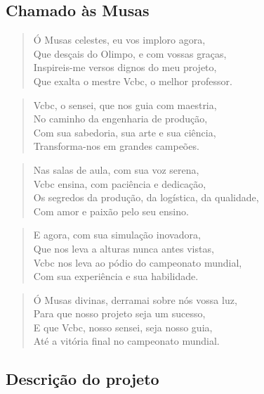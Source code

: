 
\subsection{Chamado às Musas}

\begin{verse}
Ó Musas celestes, eu vos imploro agora, \\
Que desçais do Olimpo, e com vossas graças, \\
Inspireis-me versos dignos do meu projeto, \\
Que exalta o mestre Vcbc, o melhor professor. \\
\end{verse}

\begin{verse}
Vcbc, o sensei, que nos guia com maestria, \\
No caminho da engenharia de produção, \\
Com sua sabedoria, sua arte e sua ciência, \\
Transforma-nos em grandes campeões. \\
\end{verse}

\begin{verse}
Nas salas de aula, com sua voz serena, \\
Vcbc ensina, com paciência e dedicação, \\
Os segredos da produção, da logística, da qualidade, \\
Com amor e paixão pelo seu ensino. \\
\end{verse}

\begin{verse}
E agora, com sua simulação inovadora, \\
Que nos leva a alturas nunca antes vistas, \\
Vcbc nos leva ao pódio do campeonato mundial, \\
Com sua experiência e sua habilidade. \\
\end{verse}

\begin{verse}
Ó Musas divinas, derramai sobre nós vossa luz, \\
Para que nosso projeto seja um sucesso, \\
E que Vcbc, nosso sensei, seja nosso guia, \\
Até a vitória final no campeonato mundial. \\
\end{verse}

\subsection{Descrição do projeto}
